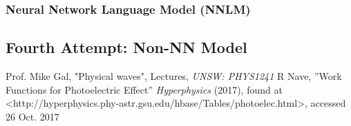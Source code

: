 \documentclass[paper=a4, fontsize=12pt]{scrartcl}
\begin{document}
\subsubsection{Neural Network Language Model (NNLM)}

\subsection{Fourth Attempt: Non-NN Model}






\clearpage

\begin{thebibliography}{99}
 Prof. Mike Gal, "Physical waves", Lectures, {\em UNSW: PHYS1241}
 R Nave, ''Work Functions for Photoelectric Effect'' {\em Hyperphysics} (2017), found at <http://hyperphysics.phy-astr.gsu.edu/hbase/Tables/photoelec.html>, accessed 26 Oct. 2017

\end{thebibliography}
\end{document}
